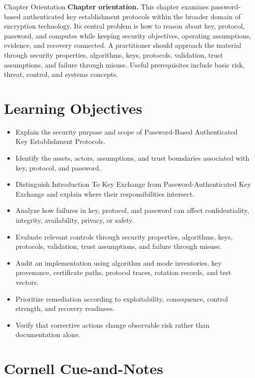 \documentclass[11pt,letterpaper]{article}
\title{\CornellDocumentTitle}
\author{}
\date{}
\begin{document}
\maketitle
\begin{CornellOverviewBox}{Chapter Orientation}
\textbf{Chapter orientation.} This chapter examines password-based authenticated key establishment protocols within the broader domain of encryption technology. Its central problem is how to reason about key, protocol, password, and computes while keeping security objectives, operating assumptions, evidence, and recovery connected. A practitioner should approach the material through security properties, algorithms, keys, protocols, validation, trust assumptions, and failure through misuse. Useful prerequisites include basic risk, threat, control, and systems concepts.
\end{CornellOverviewBox}
\section*{Learning Objectives}
\begin{itemize}
\item Explain the security purpose and scope of Password-Based Authenticated Key Establishment Protocols.
\item Identify the assets, actors, assumptions, and trust boundaries associated with key, protocol, and password.
\item Distinguish Introduction To Key Exchange from Password-Authenticated Key Exchange and explain where their responsibilities intersect.
\item Analyze how failures in key, protocol, and password can affect confidentiality, integrity, availability, privacy, or safety.
\item Evaluate relevant controls through security properties, algorithms, keys, protocols, validation, trust assumptions, and failure through misuse.
\item Audit an implementation using algorithm and mode inventories, key provenance, certificate paths, protocol traces, rotation records, and test vectors.
\item Prioritize remediation according to exploitability, consequence, control strength, and recovery readiness.
\item Verify that corrective actions change observable risk rather than documentation alone.
\end{itemize}
\section*{Cornell Cue-and-Notes}
\end{document}
